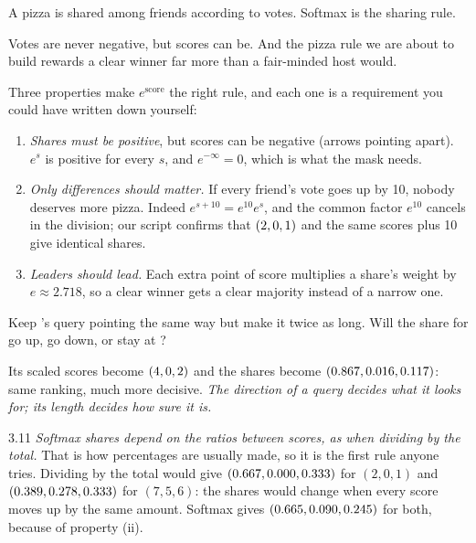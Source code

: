 \Picture A pizza is shared among friends according to votes. Softmax is the sharing rule.

\begin{breaks}
Votes are never negative, but scores can be. And the pizza rule we are about to build rewards a clear winner far
more than a fair-minded host would.
\end{breaks}

Three properties make $e^{\text{score}}$ the right rule, and each one is a requirement you could have written
down yourself:
\begin{enumerate}[label=(\roman*)]
\item \emph{Shares must be positive}, but scores can be negative (arrows pointing apart). $e^{s}$ is positive for
every $s$, and $e^{-\infty}=0$, which is what the mask needs.
\item \emph{Only differences should matter.} If every friend's vote goes up by 10, nobody deserves more pizza.
Indeed $e^{s+10}=e^{10}e^{s}$, and the common factor $e^{10}$ cancels in the division; our script confirms that
$(2,0,1)$ and the same scores plus 10 give identical shares.
\item \emph{Leaders should lead.} Each extra point of score multiplies a share's weight by $e\approx2.718$, so a
clear winner gets a clear majority instead of a narrow one.
\end{enumerate}

\Predict Keep 's query pointing the same way but make it twice as long. Will the share for 
go up, go down, or stay at \aWaste?

Its scaled scores become $(4, 0, 2)$ and the shares become $(0.867, 0.016, 0.117)$: same ranking, much
more decisive. \emph{The direction of a query decides what it looks for; its length decides how sure it is.}

\begin{wrongidea}{3.11}
\emph{Softmax shares depend on the ratios between scores, as when dividing by the total.} That is how percentages
are usually made, so it is the first rule anyone tries. Dividing by the total would give
$(0.667, 0.000, 0.333)$ for $(2,0,1)$ and $(0.389, 0.278, 0.333)$ for $(7,5,6)$: the shares would change when every score moves up by the same
amount. Softmax gives $(0.665, 0.090, 0.245)$ for both, because of property (ii).
\end{wrongidea}

